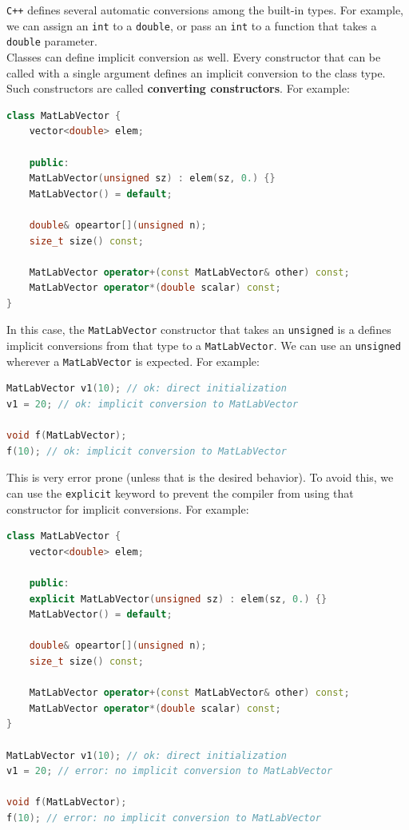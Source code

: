 \texttt{C++} defines several automatic conversions among the built-in types. For example,
we can assign an \texttt{int} to a \texttt{double}, or pass an \texttt{int} to a function
that takes a \texttt{double} parameter.\\

Classes can define implicit conversion as well. Every constructor that can be called with a
single argument defines an implicit conversion to the class type. Such constructors are called
\textbf{converting constructors}. For example:\\

\begin{lstlisting}[language=C++]
class MatLabVector {
    vector<double> elem;

    public:
    MatLabVector(unsigned sz) : elem(sz, 0.) {}
    MatLabVector() = default;

    double& opeartor[](unsigned n);
    size_t size() const;

    MatLabVector operator+(const MatLabVector& other) const;
    MatLabVector operator*(double scalar) const;    
}
\end{lstlisting}

In this case, the \texttt{MatLabVector} constructor that takes an \texttt{unsigned} is a
defines implicit conversions from that type to a \texttt{MatLabVector}. We can use an 
\texttt{unsigned} wherever a \texttt{MatLabVector} is expected. For example:\\

\begin{lstlisting}[language=C++]
MatLabVector v1(10); // ok: direct initialization
v1 = 20; // ok: implicit conversion to MatLabVector

void f(MatLabVector);
f(10); // ok: implicit conversion to MatLabVector
\end{lstlisting}

This is very error prone (unless that is the desired behavior). To avoid this, we can use
the \texttt{explicit} keyword to prevent the compiler from using that constructor for implicit
conversions. For example:\\

\begin{lstlisting}[language=C++]
class MatLabVector {
    vector<double> elem;

    public:
    explicit MatLabVector(unsigned sz) : elem(sz, 0.) {}
    MatLabVector() = default;

    double& opeartor[](unsigned n);
    size_t size() const;

    MatLabVector operator+(const MatLabVector& other) const;
    MatLabVector operator*(double scalar) const;    
}

MatLabVector v1(10); // ok: direct initialization
v1 = 20; // error: no implicit conversion to MatLabVector

void f(MatLabVector);
f(10); // error: no implicit conversion to MatLabVector
\end{lstlisting}

